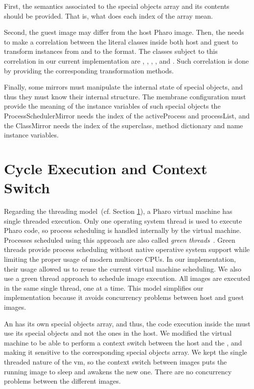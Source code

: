 \begin{description}
	First, the semantics associated to the special objects array and its contents should be provided. That is, what does each index of the array mean.
	
	Second, the guest image may differ from the host Pharo image. Then, the \objectspace needs to make a correlation between the literal classes inside both host and guest to transform instances from and to the \objectspace format. The classes subject to this correlation in our current implementation are , , , ,  and . Such correlation is done by providing the corresponding transformation methods.
	
	Finally, some mirrors must manipulate the internal state of special objects, and thus they must know their internal structure. The membrane configuration must provide the meaning of the instance variables of such special objects \ie the ProcessSchedulerMirror needs the index of the activeProcess and processList, and the ClassMirror needs the index of the superclass, method dictionary and name instance variables.
\end{description}

\section{Cycle Execution and Context Switch} \label{sec:context_switch}

Regarding the threading model~(cf. Section \ref{sec:context_switch}), a Pharo virtual machine has single threaded execution. Only one operating system thread is used to execute Pharo code, so process scheduling is handled internally by the virtual machine. Processes scheduled using this approach are also called \emph{green threads}~. Green threads provide process scheduling without native operative system support while limiting the proper usage of modern multicore CPUs. In our implementation, their usage allowed us to reuse the current virtual machine scheduling. We also use a green thread approach to schedule image execution. All images are executed in the same single thread, one at a time. This model simplifies our implementation because it avoids concurrency problems between host and guest images.


An \objectspace has its own special objects array, and thus, the code execution inside the \objectspace must use its special objects and not the ones in the host. We modified the virtual machine to be able to perform a context switch between the host and the \objectspace, and making it sensitive to the corresponding special objects array. We kept the single threaded nature of the vm, so the context switch between images puts the running image to sleep and awakens the new one. There are no concurrency problems between the different images.

